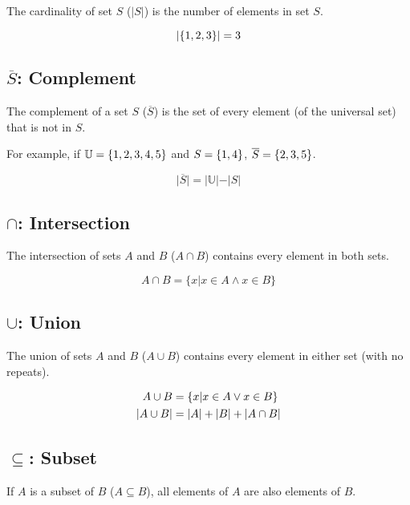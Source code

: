 \documentclass{report}
\DeclarePairedDelimiter{\card}{\lvert}{\rvert}
\DeclarePairedDelimiter{\makeset}{\{}{\}}
\newcommand{\universal}{\mathbb{U}}
\begin{document}
The cardinality of set $S$ ($\vert S \vert$) is the number of elements in set $S$.

\begin{equation}
    \card{\makeset{1, 2, 3}} = 3
\end{equation}

\subsection{$\overline{S}$: Complement}

The complement of a set $S$ ($\overline{S}$) is the set of every element (of the universal set) that is not in $S$.

For example, if $\universal = \makeset{1, 2, 3, 4, 5}$ and $S = \makeset{1, 4}$, $\overline{S} = \makeset{2, 3, 5}$.

\begin{equation}
    \vert \overline{S} \vert = \vert \universal \vert - \vert S \vert
\end{equation}

\subsection{$\cap$: Intersection}

The intersection of sets $A$ and $B$ ($A \cap B$) contains every element in both sets.

\begin{equation}
    A \cap B = \{x | x \in A \land x \in B\} 
\end{equation}

\subsection{$\cup$: Union}

The union of sets $A$ and $B$ ($A \cup B$) contains every element in either set (with no repeats).

\begin{align}
    A \cup B &= \{x \vert x \in A \lor x \in B\} \\
    \card{A \cup B} &= \card{A} + \card{B} + \card{A \cap B}
\end{align}

\subsection{$\subseteq$: Subset}

If $A$ is a subset of $B$ ($A \subseteq B$), all elements of $A$ are also elements of $B$.
\end{document}
